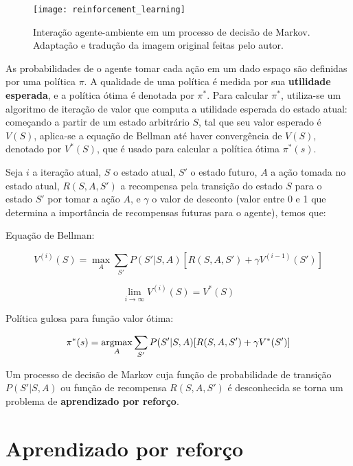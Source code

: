 \begin{figure}[h!]
\texttt{[image: reinforcement\_learning]}
\centering
\caption{Interação agente-ambiente em um processo de decisão de Markov\cite{sutton2018reinforcement}. Adaptação e tradução da imagem original feitas pelo autor.}
\end{figure}

As probabilidades de o agente tomar cada ação em um dado espaço são definidas por uma política $\pi$.
A qualidade de uma política é medida por sua \textbf{utilidade esperada}, e a política ótima é denotada por $\pi^{*}$.
Para calcular $\pi^{*}$, utiliza-se um algoritmo de iteração de valor que computa a utilidade esperada do estado atual:
começando a partir de um estado arbitrário $S$, tal que seu valor esperado é $V(S)$, aplica-se a equação de Bellman até haver convergência de $V(S)$, denotado por $V^{*}(S)$, que é usado para calcular a política ótima $\pi^{*}(s)$.

Seja $i$ a iteração atual, $S$ o estado atual, $S'$ o estado futuro, $A$ a ação tomada no estado atual, $R(S,A,S')$ a recompensa pela transição do estado $S$ para o estado $S'$ por tomar a ação $A$, e $\gamma$ o valor de desconto (valor entre 0 e 1 que determina a importância de recompensas futuras para o agente), temos que:

Equação de Bellman:

\begin{equation} \label{eq:bellman}
V^{(i)}(S) = \max_{A}\sum_{S'}P(S'|S,A)[R(S,A,S') + \gamma V^{(i-1)}(S')]
\end{equation}

\begin{equation} \label{eq:qvalue}
\lim_{i\to\infty} V^{(i)}(S) = V^{*}(S)
\end{equation}

Política gulosa para função valor ótima:

\begin{equation} \label{eq:opt_pol}
\pi^{*}(s) = \operatorname*{argmax}_{A}\sum_{S'}P(S'|S,A)[R(S,A,S') + \gamma V^{*}(S')]
\end{equation}

Um processo de decisão de Markov cuja função de probabilidade de transição $P(S'|S,A)$ ou função de recompensa $R(S,A,S')$ é desconhecida se torna um problema de \textbf{aprendizado por reforço}.


\section{Aprendizado por reforço}
\label{sec:rl}

